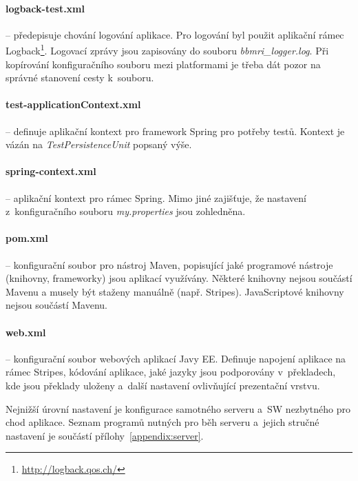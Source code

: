 \documentclass[11pt,draft,oneside]{fithesis2}
\begin{document}
\paragraph*{logback-test.xml} -- předepisuje chování logování aplikace. Pro logování byl použit aplikační rámec Logback\footnote{\url{http://logback.qos.ch/}}. Logovací zprávy jsou zapisovány do souboru \textit{bbmri\_logger.log}. Při kopírování konfiguračního souboru mezi platformami je třeba dát pozor na správné stanovení cesty k~souboru.

\paragraph*{test-applicationContext.xml} -- definuje aplikační kontext pro framework Spring pro potřeby testů. Kontext je vázán na \textit{TestPersistenceUnit} popsaný výše.

\paragraph*{spring-context.xml} -- aplikační kontext pro rámec Spring. Mimo jiné zajišťuje, že nastavení z~konfiguračního souboru \textit{my.properties} jsou zohledněna.

\paragraph*{pom.xml} -- konfigurační soubor pro nástroj Maven, popisující jaké programové nástroje (knihovny, frameworky) jsou aplikací využívány. Některé knihovny nejsou součástí Mavenu a musely být staženy manuálně (např. Stripes). JavaScriptové knihovny nejsou součástí Mavenu.

\paragraph*{web.xml} -- konfigurační soubor webových aplikací Javy EE. Definuje napojení aplikace na rámec Stripes, kódování aplikace, jaké jazyky jsou podporovány v~překladech, kde jsou překlady uloženy a~další nastavení ovlivňující prezentační vrstvu.

Nejnižší úrovní nastavení je konfigurace samotného serveru a~SW nezbytného pro chod aplikace. Seznam programů nutných pro běh serveru a~jejich stručné nastavení je součástí přílohy~\ref{appendix:server}.

\end{document}
